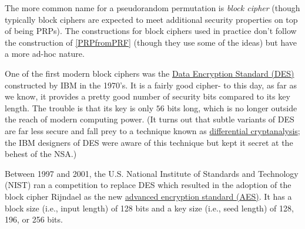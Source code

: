 \hypertarget{feistelrounds}{}

The more common name for a pseudorandom permutation is \emph{block
cipher} (though typically block ciphers are expected to meet additional
security properties on top of being PRPs). The constructions for block
ciphers used in practice don't follow the construction of
\cref{PRPfromPRF} (though they use some of the ideas) but have a more
ad-hoc nature.

One of the first modern block ciphers was the
\href{https://goo.gl/XiCvjs}{Data Encryption Standard (DES)} constructed
by IBM in the 1970's. It is a fairly good cipher- to this day, as far as
we know, it provides a pretty good number of security bits compared to
its key length. The trouble is that its key is only \(56\) bits long,
which is no longer outside the reach of modern computing power. (It
turns out that subtle variants of DES are far less secure and fall prey
to a technique known as \href{https://goo.gl/GAvbh8}{differential
cryptanalysis}; the IBM designers of DES were aware of this technique
but kept it secret at the behest of the NSA.)

Between 1997 and 2001, the U.S. National Institute of Standards and
Technology (NIST) ran a competition to replace DES which resulted in the
adoption of the block cipher Rijndael as the new
\href{https://goo.gl/1HnqFb}{advanced encryption standard (AES)}. It has
a block size (i.e., input length) of 128 bits and a key size (i.e., seed
length) of 128, 196, or 256 bits.

